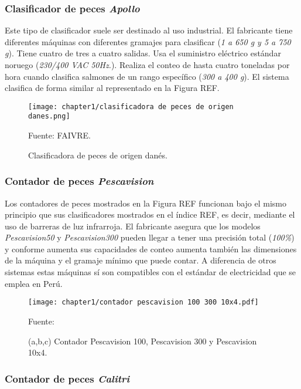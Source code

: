 \subsubsection{Clasificador de peces \textit{Apollo}}

Este tipo de clasificador suele ser destinado al uso industrial. El fabricante tiene diferentes máquinas con diferentes gramajes para clasificar (\textit{1 a 650 g y 5 a 750 g}). Tiene cuatro de tres a cuatro salidas. Usa el suministro eléctrico estándar noruego (\textit{230/400 VAC 50Hz.}). Realiza el conteo de hasta cuatro toneladas por hora cuando clasifica salmones de un rango específico (\textit{300 a 400 g}). El sistema clasifica de forma similar al representado en la Figura REF. \cite{Apollo2013}

\begin{figure}[H]
	\centering
	\texttt{[image: chapter1/clasificadora de peces de origen danes.png]}
	\caption{Clasificadora de peces de origen danés.}
	Fuente: FAIVRE.
	\label{fig:clasificadora de peces de origen danes}
\end{figure}

\subsubsection{Contador de peces \textit{Pescavision}}

Los contadores de peces mostrados en la Figura REF funcionan bajo el mismo principio que sus clasificadores mostrados en el índice REF, es decir, mediante el uso de barreras de luz infrarroja. El fabricante asegura que los modelos \textit{Pescavision50} y \textit{Pescavision300} pueden llegar a tener una precisión total (\textit{100\%}) y conforme aumenta sus capacidades de conteo aumenta también las dimensiones de la máquina y el gramaje mínimo que puede contar. A diferencia de otros sistemas estas máquinas sí son compatibles con el estándar de electricidad que se emplea en Perú.

\begin{figure}[H]
	\centering
	\texttt{[image: chapter1/contador pescavision 100 300 10x4.pdf]}
	\caption{(a,b,c)  Contador Pescavision 100, Pescavision 300 y Pescavision 10x4.}
	Fuente: \cite{FAIVRE2019a}
	\label{fig:contador pescavision 100 300 10x4}
\end{figure}

\subsubsection{Contador de peces \textit{Calitri}}

